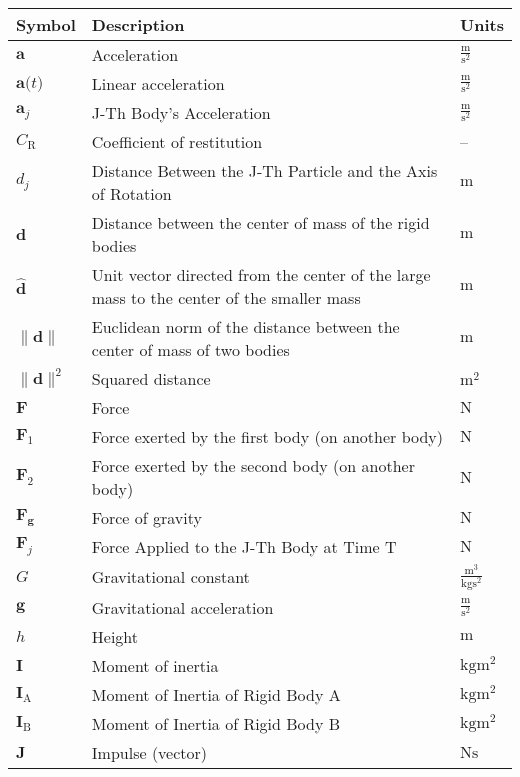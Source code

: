 \documentclass[12pt]{article}
\begin{document}
\begin{longtabu}{l X[l] l}
\toprule
\textbf{Symbol} & \textbf{Description} & \textbf{Units}
\\
\midrule
\endhead
$\symbf{a}$ & Acceleration & $\frac{\text{m}}{\text{s}^{2}}$
\\
$\symbf{a}\text{(}t\text{)}$ & Linear acceleration & $\frac{\text{m}}{\text{s}^{2}}$
\\
${\symbf{a}_{j}}$ & J-Th Body's Acceleration & $\frac{\text{m}}{\text{s}^{2}}$
\\
${C_{\text{R}}}$ & Coefficient of restitution & --
\\
${d_{j}}$ & Distance Between the J-Th Particle and the Axis of Rotation & ${\text{m}}$
\\
$\symbf{d}$ & Distance between the center of mass of the rigid bodies & ${\text{m}}$
\\
$\symbf{\hat{d}}$ & Unit vector directed from the center of the large mass to the center of the smaller mass & ${\text{m}}$
\\
$\|\symbf{d}\|$ & Euclidean norm of the distance between the center of mass of two bodies & ${\text{m}}$
\\
${\|\symbf{d}\|^{2}}$ & Squared distance & ${\text{m}^{2}}$
\\
$\symbf{F}$ & Force & ${\text{N}}$
\\
${\symbf{F}_{1}}$ & Force exerted by the first body (on another body) & ${\text{N}}$
\\
${\symbf{F}_{2}}$ & Force exerted by the second body (on another body) & ${\text{N}}$
\\
${\symbf{F}_{\symbf{g}}}$ & Force of gravity & ${\text{N}}$
\\
${\symbf{F}_{j}}$ & Force Applied to the J-Th Body at Time T & ${\text{N}}$
\\
$G$ & Gravitational constant & $\frac{\text{m}^{3}}{\text{kg}\text{s}^{2}}$
\\
$\symbf{g}$ & Gravitational acceleration & $\frac{\text{m}}{\text{s}^{2}}$
\\
$h$ & Height & ${\text{m}}$
\\
$\symbf{I}$ & Moment of inertia & $\text{kg}\text{m}^{2}$
\\
${\symbf{I}_{\text{A}}}$ & Moment of Inertia of Rigid Body A & $\text{kg}\text{m}^{2}$
\\
${\symbf{I}_{\text{B}}}$ & Moment of Inertia of Rigid Body B & $\text{kg}\text{m}^{2}$
\\
$\symbf{J}$ & Impulse (vector) & $\text{N}\text{s}$
\\

\end{longtabu}
\end{document}
